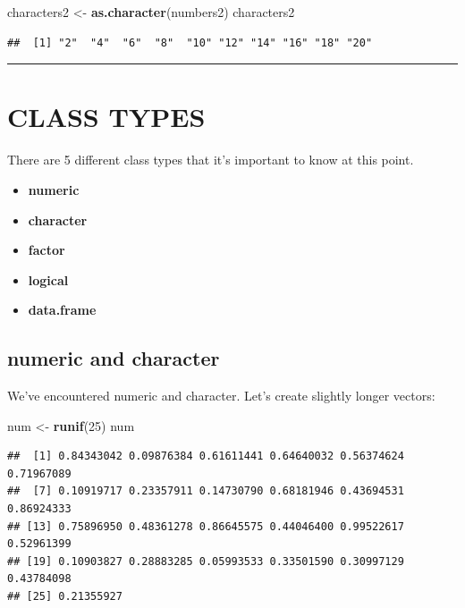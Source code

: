 \documentclass[
]{book}
\newenvironment{Shaded}{\begin{snugshade}}{\end{snugshade}}
\newcommand{\DecValTok}[1]{\textcolor[rgb]{0.00,0.00,0.81}{#1}}
\newcommand{\KeywordTok}[1]{\textcolor[rgb]{0.13,0.29,0.53}{\textbf{#1}}}
\newcommand{\NormalTok}[1]{#1}
\newcommand{\StringTok}[1]{\textcolor[rgb]{0.31,0.60,0.02}{#1}}
\providecommand{\tightlist}{%
  \setlength{\itemsep}{0pt}\setlength{\parskip}{0pt}}
\begin{document}
\begin{Shaded}
\begin{Highlighting}[]
\NormalTok{characters2 <-}\StringTok{ }\KeywordTok{as.character}\NormalTok{(numbers2)}
\NormalTok{characters2}
\end{Highlighting}
\end{Shaded}

\begin{verbatim}
##  [1] "2"  "4"  "6"  "8"  "10" "12" "14" "16" "18" "20"
\end{verbatim}

\begin{center}\rule{0.5\linewidth}{0.5pt}\end{center}

\hypertarget{class-types}{%
\section{CLASS TYPES}\label{class-types}}

There are 5 different class types that it's important to know at this point.

\begin{itemize}
\tightlist
\item
  \textbf{numeric}
\item
  \textbf{character}
\item
  \textbf{factor}
\item
  \textbf{logical}
\item
  \textbf{data.frame}
\end{itemize}

\hypertarget{numeric-and-character}{%
\subsection{numeric and character}\label{numeric-and-character}}

We've encountered numeric and character. Let's create slightly longer vectors:

\begin{Shaded}
\begin{Highlighting}[]
\NormalTok{num <-}\StringTok{ }\KeywordTok{runif}\NormalTok{(}\DecValTok{25}\NormalTok{)}
\NormalTok{num}
\end{Highlighting}
\end{Shaded}

\begin{verbatim}
##  [1] 0.84343042 0.09876384 0.61611441 0.64640032 0.56374624 0.71967089
##  [7] 0.10919717 0.23357911 0.14730790 0.68181946 0.43694531 0.86924333
## [13] 0.75896950 0.48361278 0.86645575 0.44046400 0.99522617 0.52961399
## [19] 0.10903827 0.28883285 0.05993533 0.33501590 0.30997129 0.43784098
## [25] 0.21355927
\end{verbatim}
\end{document}
